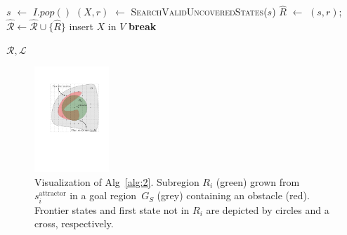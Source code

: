 \documentclass[letterpaper, 10 pt, conference]{ieeeconf}  %
\newcommand{\calL}{\ensuremath{\mathcal{L}}\xspace}
\newcommand{\calR}{\ensuremath{\mathcal{R}}\xspace}
\newcommand{\sAttract}{\ensuremath{s^{\text{attractor}}_i}\xspace}
\begin{document}
\begin{algorithm}[t]
\begin{algorithmic}[1]
\vspace{2mm}        
        
         \label{alg:1:iv_loop}
            \State $s$ $\leftarrow$ $I.pop()$
			\If {$\nexists R \in \calR \cup \hat{\calR}$ s.t. $s \in R$ }      
\State $(X, r)$ $\leftarrow$ \textsc{SearchValidUncoveredStates}($s$)
                \State $\hat{R}$ $\leftarrow$ $(s,r)$;
				\hspace{2mm}
				$\hat{\calR} \leftarrow \hat{\calR} \cup \{ \hat{R} \}$   \label{alg:1:iv_region}
                    \label{alg:1:x_states}
                    \State insert $X$ in $V$
                    \State \textbf{break} \label{alg:1:break}
                \EndIf
            \EndIf
        \EndWhile
    \EndWhile

  \vspace{2mm}

  \State \Return $\calR, \calL$
\EndProcedure
\end{algorithmic}
\end{algorithm}

\begin{figure}[tb]
  \centering
  	\includegraphics[width=0.25\textwidth]{Alg2.pdf}
  \caption{
  Visualization of Alg~\ref{alg:2}. Subregion $R_i$ (green) grown from $\sAttract$ in a goal region~$G_S$ (grey) containing an obstacle (red).
  Frontier states  and first state not in $R_i$ are depicted by circles and a cross, respectively.
}
   	\label{fig:alg2}
 \vspace{-5mm}
\end{figure}


\end{document}
